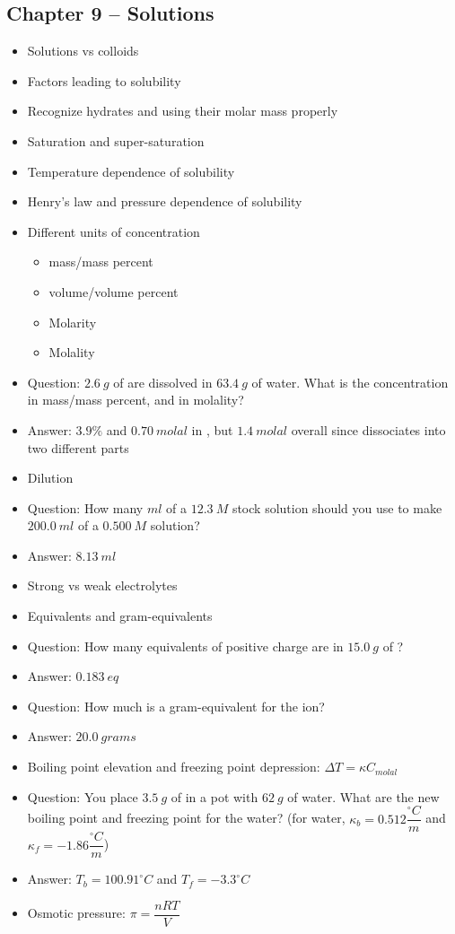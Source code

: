 \documentclass[12pt, letterpaper]{memoir}
\begin{document}
	\subsection*{Chapter 9 --  Solutions}
	\begin{itemize}
		\item Solutions vs colloids
		\item Factors leading to solubility
		\item Recognize hydrates and using their molar mass properly
		\item Saturation and super-saturation
		\item Temperature dependence of solubility
		\item Henry's law and pressure dependence of solubility
		\item Different units of concentration
		\begin{itemize}
			\item mass/mass percent
			\item volume/volume percent
			\item Molarity
			\item Molality
		\end{itemize}
		\item Question: $2.6~g$ of  are dissolved in $63.4~g$ of water. What is the concentration in mass/mass percent, and in molality?
		\item Answer: $3.9\%$ and $0.70~molal$ in , but $1.4~molal$ overall since  dissociates into two different parts
		\item Dilution
		\item Question: How many $ml$ of a $12.3~M$ stock solution should you use to make $200.0~ml$ of a $0.500~M$ solution?
		\item Answer: $8.13~ml$
		\item Strong vs weak electrolytes
		\item Equivalents and gram-equivalents
		\item Question: How many equivalents of positive charge are in $15.0~g$ of ?
		\item Answer: $0.183~eq$
		\item Question: How much is a gram-equivalent for the  ion?
		\item Answer: $20.0~grams$
		\item Boiling point elevation and freezing point depression: $\Delta T=\kappa C_{molal}$
		\item Question: You place $3.5~g$ of  in a pot with $62~g$ of water. What are the new boiling point and freezing point for the water? (for water, $\kappa_b = 0.512\dfrac{^\circ C}{m}$ and $\kappa_f = -1.86\dfrac{^\circ C}{m}$)
		\item Answer: $T_b = 100.91 ^\circ C$ and $T_f = -3.3 ^\circ C$
		\item Osmotic pressure: $\pi = \dfrac{nRT}{V}$
	\end{itemize}
\end{document}
